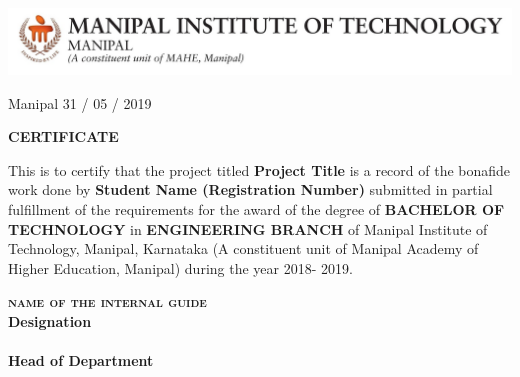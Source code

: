\begin{titlepage}
\thispagestyle{empty}
    \begin{center}
        {\includegraphics[height=0.09\textheight, width=1\textwidth]{Figures/mit.jpg}}
    \end{center}
    \begin{flushright}
        \vspace{0.1cm}
        Manipal
        \linebreak
        \vspace{0.5cm}
        31 / 05 / 2019
    \end{flushright} 
    \begin{center}
    \Large{\textbf{\textsc{CERTIFICATE}}}
    \linebreak
    \end{center}
    This is to certify that the project titled \textbf{Project Title} is a record of the bonafide
    work done by \textbf{Student Name (Registration Number)} submitted in partial fulfillment of the
    requirements for the award of the degree of \textbf{BACHELOR OF TECHNOLOGY} in
    \textbf{ENGINEERING BRANCH} of Manipal Institute of Technology, Manipal, Karnataka
    (A constituent unit of Manipal Academy of Higher Education, Manipal) during the year 2018-
    2019.
    
    \vspace{7cm}
    \begin{center}
    \begin{multicols}{2}
        \textbf{\textsc{\normalsize{name of the internal guide}}\\
        \footnotesize{Designation}\\
        }
        \columnbreak
        \textbf{\footnotesize{}\\
        \textbf{\footnotesize{Head of Department}}
        }
    \end{multicols}
    \end{center}
\end{titlepage}